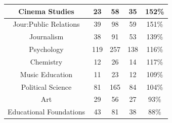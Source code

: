 \documentclass[10pt]{article}
\begin{document}
\begin{longtable}[c]{|ccccc|}
	\multicolumn{1}{|c|}{Cinema Studies}                             & \multicolumn{1}{c|}{23}                              & \multicolumn{1}{c|}{58}                                  & \multicolumn{1}{c|}{35}                 & 152\%                 \\ \hline
	\multicolumn{1}{|c|}{Jour:Public Relations}                      & \multicolumn{1}{c|}{39}                              & \multicolumn{1}{c|}{98}                                  & \multicolumn{1}{c|}{59}                 & 151\%                 \\ \hline
	\multicolumn{1}{|c|}{Journalism}                                 & \multicolumn{1}{c|}{38}                              & \multicolumn{1}{c|}{91}                                  & \multicolumn{1}{c|}{53}                 & 139\%                 \\ \hline
	\multicolumn{1}{|c|}{Psychology}                                 & \multicolumn{1}{c|}{119}                             & \multicolumn{1}{c|}{257}                                 & \multicolumn{1}{c|}{138}                & 116\%                 \\ \hline
	\multicolumn{1}{|c|}{Chemistry}                                  & \multicolumn{1}{c|}{12}                              & \multicolumn{1}{c|}{26}                                  & \multicolumn{1}{c|}{14}                 & 117\%                 \\ \hline
	\multicolumn{1}{|c|}{Music Education}                            & \multicolumn{1}{c|}{11}                              & \multicolumn{1}{c|}{23}                                  & \multicolumn{1}{c|}{12}                 & 109\%                 \\ \hline
	\multicolumn{1}{|c|}{Political Science}                          & \multicolumn{1}{c|}{81}                              & \multicolumn{1}{c|}{165}                                 & \multicolumn{1}{c|}{84}                 & 104\%                 \\ \hline
	\multicolumn{1}{|c|}{Art}                                        & \multicolumn{1}{c|}{29}                              & \multicolumn{1}{c|}{56}                                  & \multicolumn{1}{c|}{27}                 & 93\%                  \\ \hline
	\multicolumn{1}{|c|}{Educational Foundations}                    & \multicolumn{1}{c|}{43}                              & \multicolumn{1}{c|}{81}                                  & \multicolumn{1}{c|}{38}                 & 88\%                  \\ \hline

\end{longtable}
\end{document}

